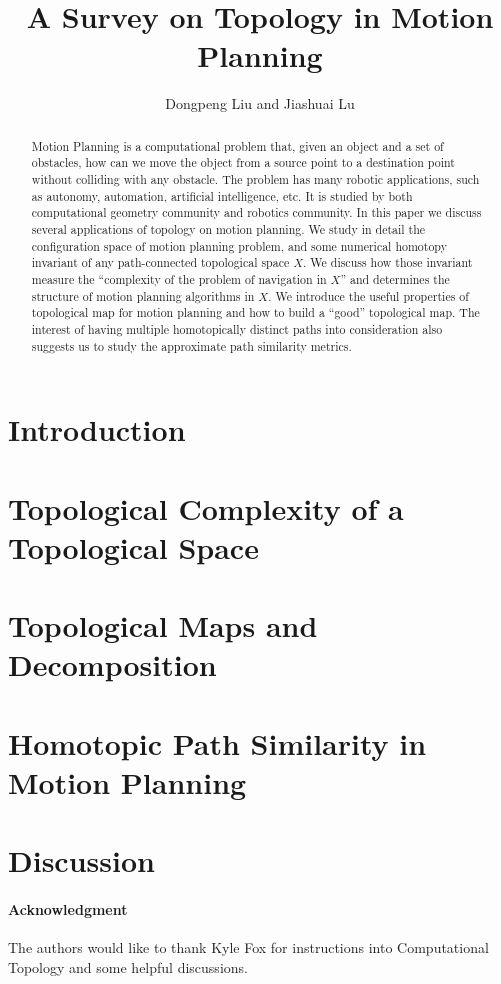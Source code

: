 \documentclass[12pt,twoside]{article}
\begin{document}
\title{A Survey on Topology in Motion Planning}

\author{
Dongpeng Liu %
and Jiashuai Lu%
}


\maketitle

%
\begin{abstract}
  Motion Planning is a computational problem that, given an object and a set of obstacles, how can we move the object from a source point to a destination point without colliding with any obstacle.
  The problem has many robotic applications, such as autonomy, automation, artificial intelligence, etc. It is studied by both computational geometry community and robotics community.
  In this paper we discuss several applications of topology on motion planning.
  We study in detail the configuration space of motion planning problem, and some numerical homotopy invariant of any path-connected topological space \(X\). We discuss how those invariant measure the ``complexity of the problem of navigation in \(X\)'' and determines the structure of motion planning algorithms in \(X\).
  We introduce the useful properties of topological map for motion planning and how to build a ``good'' topological map. The interest of having multiple homotopically distinct paths into consideration also suggests us to study the approximate path similarity metrics.
\end{abstract}

\setcounter{page}{0}

\section{Introduction}\label{sec:intro}


\section{Topological Complexity of a Topological Space}\label{sec:complexity}

\section{Topological Maps and Decomposition}\label{sec:decomposition}

\section{Homotopic Path Similarity in Motion Planning}\label{sec:sim}

\section{Discussion}\label{sec:dis}

\paragraph*{Acknowledgment} The authors would like to thank Kyle Fox for instructions into Computational Topology and some helpful discussions.



\end{document}
